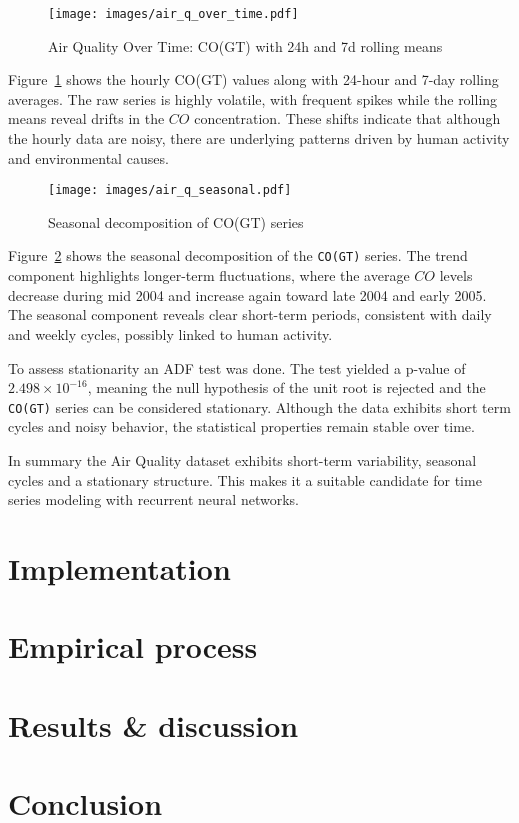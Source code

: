 \documentclass[conference]{IEEEtran}
\begin{document}
\begin{figure}[H]
\centering
\texttt{[image: images/air\_q\_over\_time.pdf]}
\caption{Air Quality Over Time: CO(GT) with 24h and 7d rolling means}
\label{fig:air_q_over_time}
\end{figure}

Figure~\ref{fig:air_q_over_time} shows the hourly CO(GT) values along with 24-hour and 7-day rolling averages. The raw series is highly volatile, with frequent spikes while the rolling means reveal drifts in the $CO$ concentration. These shifts indicate that although the hourly data are noisy, there are underlying patterns driven by human activity and environmental causes.

\begin{figure}[H]
\centering
\texttt{[image: images/air\_q\_seasonal.pdf]}
\caption{Seasonal decomposition of CO(GT) series}
\label{fig:air_q_seasonal}
\end{figure}

Figure~\ref{fig:air_q_seasonal} shows the seasonal decomposition of the \texttt{CO(GT)} series. The trend component highlights longer-term fluctuations, where the average $CO$ levels decrease during mid 2004 and increase again toward late 2004 and early 2005. The seasonal component reveals clear short-term periods, consistent with daily and weekly cycles, possibly linked to human activity.

To assess stationarity an ADF test was done. The test yielded a p-value of $2.498 \times 10^{-16}$, meaning the null hypothesis of the unit root is rejected and the \texttt{CO(GT)} series can be considered stationary. Although the data exhibits short term cycles and noisy behavior, the statistical properties remain stable over time.

In summary the Air Quality dataset exhibits short-term variability, seasonal cycles and a stationary structure. This makes it a suitable candidate for time series modeling with recurrent neural networks.

\section{\textbf{Implementation}}

\section{\textbf{Empirical process}}

\section{\textbf{Results \& discussion}}

\section{\textbf{Conclusion}}



\vspace{12pt}
\end{document}
